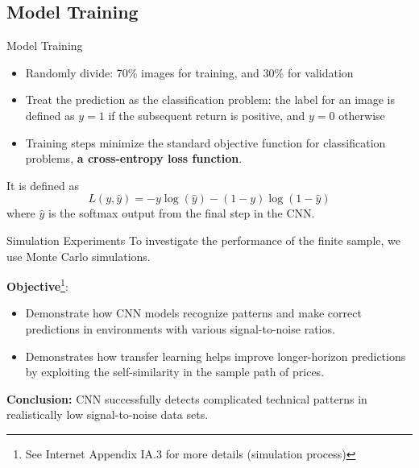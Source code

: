 \documentclass{beamer}
\begin{document}
\subsection{Model Training}
\begin{frame}{Model Training}
\begin{itemize}
    \item Randomly divide: 70\% images for training, and 30\% for validation
    \item Treat the prediction as the classification problem: the label for an image is defined as $y = 1$ if the subsequent return is positive, and $y = 0$ otherwise
    \item Training steps minimize the standard objective function for classification problems, \textbf{a cross-entropy loss function}.
\end{itemize}
  \begin{definition}
      It is defined as
      $$L(y, \hat{y}) = -y\log (\hat{y})-(1-y)\log(1-\hat{y})$$
      where $\hat{y}$ is the softmax output from the final step in the CNN.
  \end{definition}  
\end{frame}

\begin{frame}{Simulation Experiments}
    To investigate the performance of the finite sample, we use Monte Carlo simulations.

    \textbf{Objective}\footnote{See Internet Appendix IA.3 for more details (simulation process)}:
    \begin{itemize}
        \item Demonstrate how CNN models recognize patterns and make correct predictions in environments with various signal-to-noise ratios.
        \item Demonstrates how transfer learning helps improve longer-horizon predictions by exploiting the self-similarity in the sample path of prices.
    \end{itemize}
    \textbf{Conclusion:} CNN successfully detects complicated technical patterns in realistically low signal-to-noise data sets.
\end{frame}
\end{document}
